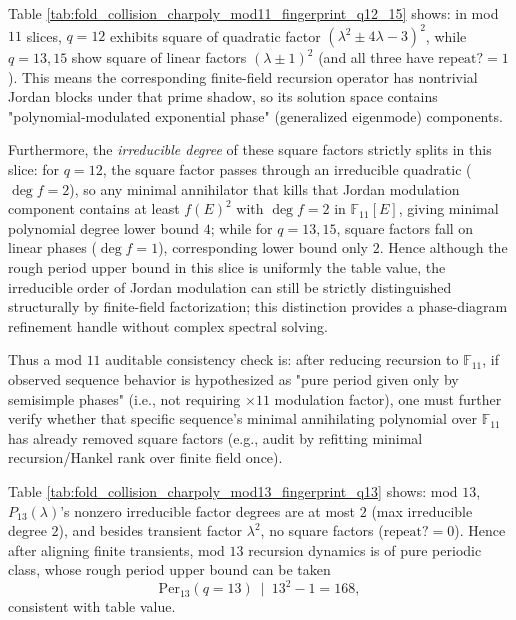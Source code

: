 \begin{remark}[Square factor \texorpdfstring{$\Rightarrow$}{=>} polynomial modulation: mod \texorpdfstring{$11$}{11} recursion audit handle]\label{rem:pom-charpoly-mod11-modulation}
Table \ref{tab:fold_collision_charpoly_mod11_fingerprint_q12_15} shows: in mod \(11\) slices, \(q=12\) exhibits square of quadratic factor \((\lambda^2\pm 4\lambda-3)^2\), while \(q=13,15\) show square of linear factors \((\lambda\pm 1)^2\) (and all three have \(\mathrm{repeat?}=1\)).
This means the corresponding finite-field recursion operator has nontrivial Jordan blocks under that prime shadow, so its solution space contains "polynomial-modulated exponential phase" (generalized eigenmode) components.
\par
Furthermore, the \emph{irreducible degree} of these square factors strictly splits in this slice: for \(q=12\), the square factor passes through an irreducible quadratic (\(\deg f=2\)), so any minimal annihilator that kills that Jordan modulation component contains at least \(f(E)^2\) with \(\deg f=2\) in \(\mathbb{F}_{11}[E]\), giving minimal polynomial degree lower bound \(4\);
while for \(q=13,15\), square factors fall on linear phases (\(\deg f=1\)), corresponding lower bound only \(2\).
Hence although the rough period upper bound in this slice is uniformly the table value, the irreducible order of Jordan modulation can still be strictly distinguished structurally by finite-field factorization; this distinction provides a phase-diagram refinement handle without complex spectral solving.
\par
Thus a mod \(11\) auditable consistency check is: after reducing recursion to \(\mathbb{F}_{11}\), if observed sequence behavior is hypothesized as "pure period given only by semisimple phases" (i.e., not requiring \(\times 11\) modulation factor), one must further verify whether that specific sequence's minimal annihilating polynomial over \(\mathbb{F}_{11}\) has already removed square factors (e.g., audit by refitting minimal recursion/Hankel rank over finite field once).
\end{remark}

\begin{remark}[Mod \texorpdfstring{$13$}{13} low-complexity fingerprint: \texorpdfstring{$q=13$}{q=13} pure period upper bound]\label{rem:pom-charpoly-mod13-small-period}
Table \ref{tab:fold_collision_charpoly_mod13_fingerprint_q13} shows: mod \(13\), \(P_{13}(\lambda)\)'s nonzero irreducible factor degrees are at most \(2\) (max irreducible degree \(2\)), and besides transient factor \(\lambda^2\), no square factors (\(\mathrm{repeat?}=0\)).
Hence after aligning finite transients, mod \(13\) recursion dynamics is of pure periodic class, whose rough period upper bound can be taken
\[
\mathrm{Per}_{13}(q=13)\ \mid\ 13^2-1=168,
\]
consistent with table value.
\end{remark}


